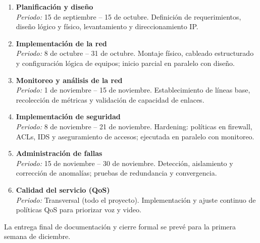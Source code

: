 \medskip
\begin{enumerate}
    \item \textbf{Planificación y diseño} \\
        	\textit{Periodo:} 15 de septiembre -- 15 de octubre. \newline
        Definición de requerimientos, diseño lógico y físico, levantamiento y direccionamiento IP.

    \item \textbf{Implementación de la red} \\
        	\textit{Periodo:} 8 de octubre -- 31 de octubre. \newline
        Montaje físico, cableado estructurado y configuración lógica de equipos; inicio parcial en paralelo con diseño.

    \item \textbf{Monitoreo y análisis de la red} \\
        	\textit{Periodo:} 1 de noviembre -- 15 de noviembre. \newline
        Establecimiento de líneas base, recolección de métricas y validación de capacidad de enlaces.

    \item \textbf{Implementación de seguridad} \\
        	\textit{Periodo:} 8 de noviembre -- 21 de noviembre. \newline
        Hardening: políticas en firewall, ACLs, IDS y aseguramiento de accesos; ejecutada en paralelo con monitoreo.

    \item \textbf{Administración de fallas} \\
        	\textit{Periodo:} 15 de noviembre -- 30 de noviembre. \newline
        Detección, aislamiento y corrección de anomalías; pruebas de redundancia y convergencia.

    \item \textbf{Calidad del servicio (QoS)} \\
        	\textit{Periodo:} Transversal (todo el proyecto). \newline
        Implementación y ajuste continuo de políticas QoS para priorizar voz y video.
\end{enumerate}

\medskip
La entrega final de documentación y cierre formal se prevé para la primera semana de diciembre.